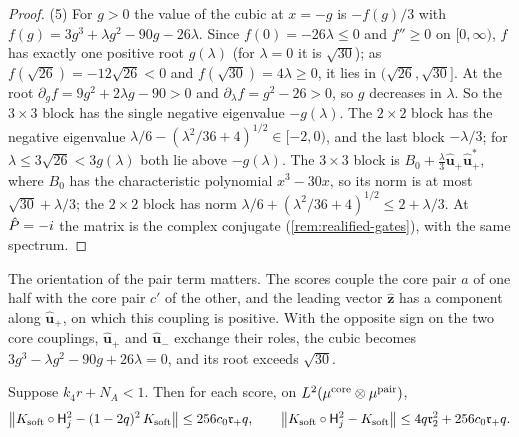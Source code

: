 \begin{proof}
(5) For $g>0$ the value of the cubic at $x=-g$ is $-f(g)/3$ with
$f(g)=3g^3+\lambda g^2-90g-26\lambda$. Since $f(0)=-26\lambda\le0$ and $f''\ge0$ on
$[0,\infty)$, $f$ has exactly one positive root $g(\lambda)$ (for $\lambda=0$ it is
$\sqrt{30}$); as $f(\sqrt{26})=-12\sqrt{26}<0$ and $f(\sqrt{30})=4\lambda\ge0$, it lies in
$(\sqrt{26},\sqrt{30}]$. At the root $\partial_gf=9g^2+2\lambda g-90>0$ and
$\partial_\lambda f=g^2-26>0$, so $g$ decreases in $\lambda$. So the $3\times3$ block has
the single negative eigenvalue $-g(\lambda)$. The $2\times2$ block has the negative
eigenvalue $\lambda/6-(\lambda^2/36+4)^{1/2}\in[-2,0)$, and the last block $-\lambda/3$;
for $\lambda\le3\sqrt{26}<3g(\lambda)$ both lie above $-g(\lambda)$. The $3\times3$ block is
$B_0+\frac\lambda3\hat{\mathbf u}_+\hat{\mathbf u}_+^*$, where $B_0$ has the characteristic polynomial
$x^3-30x$, so its norm is at most $\sqrt{30}+\lambda/3$; the $2\times2$ block has norm
$\lambda/6+(\lambda^2/36+4)^{1/2}\le2+\lambda/3$. At $\hat P=-i$ the matrix is the
complex conjugate (\cref{rem:realified-gates}), with the same spectrum.
\end{proof}

The orientation of the pair term matters. The scores couple the core pair $a$ of one
half with the core pair $c'$ of the other, and the leading vector $\hat{\mathbf z}$ has a
component along $\hat{\mathbf u}_+$, on which this coupling is positive. With the opposite sign
on the two core couplings, $\hat{\mathbf u}_+$ and $\hat{\mathbf u}_-$ exchange their roles, the
cubic becomes $3g^3-\lambda g^2-90g+26\lambda=0$, and its root exceeds $\sqrt{30}$.

\begin{lemma}\label{lem:root-square}
Suppose $k_4r+N_A<1$. Then for each score, on $L^2(\mu^{\rm core}\otimes\mu^{\rm pair})$,
\[
 \bigl\|K_{\rm soft}\circ\mathsf H_{j}^2-(1-2q)^2\,K_{\rm soft}\bigr\|\le256c_0\mathfrak r_+q,
 \qquad
 \bigl\|K_{\rm soft}\circ\mathsf H_{j}^2-K_{\rm soft}\bigr\|\le4q\mathfrak r_2^2+256c_0\mathfrak r_+q .
\]
\end{lemma}

